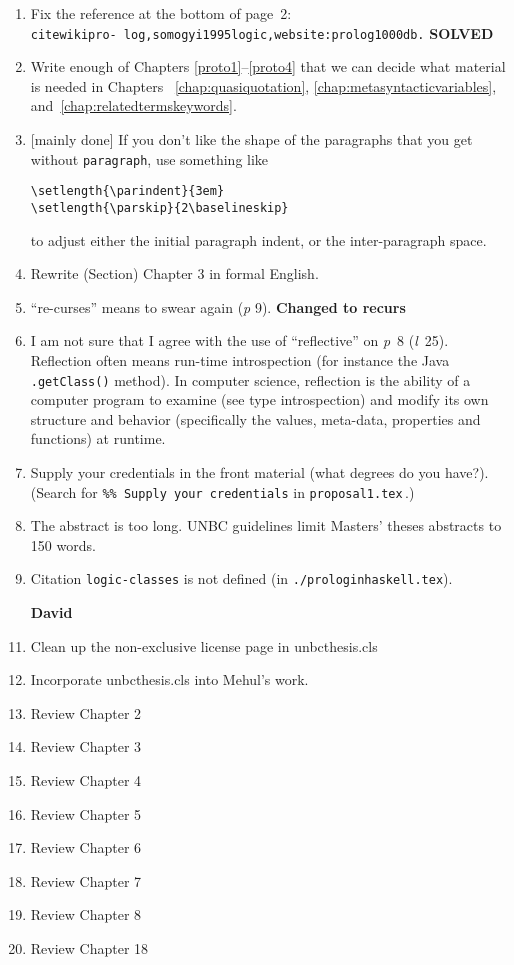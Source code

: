 \begin{scope}
\begin{enumerate}
\item
  Fix the reference at the bottom of page~2:\\
  \Verb!citewikipro- log,somogyi1995logic,website:prolog1000db.!  \textbf{SOLVED}
\item
  Write enough of Chapters \ref{proto1}--\ref{proto4} that we can decide
  what material is needed in Chapters~ \ref{chap:quasiquotation},
  \ref{chap:metasyntacticvariables},
  and~\ref{chap:relatedtermskeywords}.
\item {}[mainly done]
  If you don't like the shape of the paragraphs that you get without
  \Verb!paragraph!, use something like
  \begin{Verbatim}
\setlength{\parindent}{3em}
\setlength{\parskip}{2\baselineskip}
  \end{Verbatim}
  to adjust either the initial paragraph indent, or the inter-paragraph
  space.

\item
  Rewrite (Section) Chapter 3 in formal English.

\item
  ``re-curses'' means to swear again (\textit{p} 9). \textbf{Changed to recurs}
\item
  I am not sure that I agree with the use of ``reflective'' on
  \textit{p}~8 (\textit{l}~25).  Reflection often means run-time
  introspection (for instance the Java \Verb!.getClass()! method).
  In computer science, reflection is the ability of a computer program to examine (see type introspection) and modify its own structure and behavior (specifically the values, meta-data, properties and functions) at runtime.
  
\item
  Supply your credentials in the front material (what degrees do you
  have?).
  (Search for \Verb!%

\item
  The abstract is too long. UNBC guidelines limit Masters' theses
  abstracts to 150 words.

\item
  Citation \Verb!logic-classes! is not defined (in
  \Verb!./prologinhaskell.tex!). 

\item [\textbf{David}]
\item Clean up the non-exclusive license page in unbcthesis.cls
\item Incorporate unbcthesis.cls into Mehul's work.
\item Review Chapter 2
\item Review Chapter 3
\item Review Chapter 4
\item Review Chapter 5
\item Review Chapter 6
\item Review Chapter 7
\item Review Chapter 8
\item Review Chapter 18


\end{enumerate}
\end{scope}
